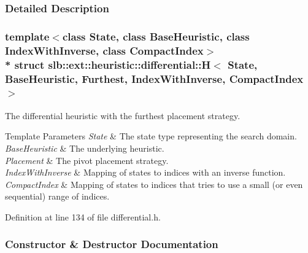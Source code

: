 \subsubsection{Detailed Description}
\subsubsection*{template$<$class State, class Base\+Heuristic, class Index\+With\+Inverse, class Compact\+Index$>$\\*
struct slb\+::ext\+::heuristic\+::differential\+::\+H$<$ State, Base\+Heuristic, Furthest, Index\+With\+Inverse, Compact\+Index $>$}

The differential heuristic with the furthest placement strategy. 


\begin{DoxyTemplParams}{Template Parameters}
{\em State} & The state type representing the search domain. \\
\hline
{\em Base\+Heuristic} & The underlying heuristic. \\
\hline
{\em Placement} & The pivot placement strategy. \\
\hline
{\em Index\+With\+Inverse} & Mapping of states to indices with an inverse function. \\
\hline
{\em Compact\+Index} & Mapping of states to indices that tries to use a small (or even sequential) range of indices. \\
\hline
\end{DoxyTemplParams}


Definition at line 134 of file differential.\+h.



\subsubsection{Constructor \& Destructor Documentation}
